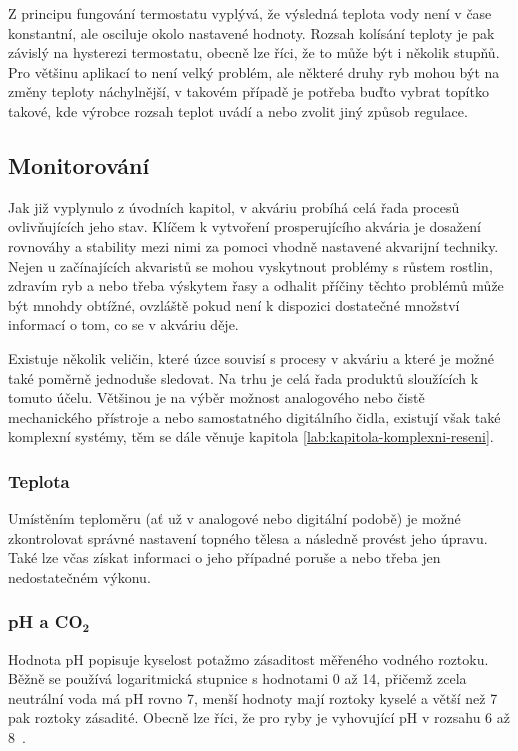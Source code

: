         Z principu fungování termostatu vyplývá, že výsledná teplota vody není v čase konstantní, ale osciluje okolo nastavené hodnoty. Rozsah kolísání teploty je pak závislý na hysterezi termostatu, obecně lze říci, že to může být i několik stupňů. Pro většinu aplikací to není velký problém, ale některé druhy ryb mohou být na změny teploty náchylnější, v takovém případě je potřeba buďto vybrat topítko takové, kde výrobce rozsah teplot uvádí a nebo zvolit jiný způsob regulace. 

    \subsection{Monitorování}
        Jak již vyplynulo z úvodních kapitol, v akváriu probíhá celá řada procesů ovlivňujících jeho stav. Klíčem k vytvoření prosperujícího akvária je dosažení rovnováhy a stability mezi nimi za pomoci vhodně nastavené akvarijní techniky. Nejen u začínajících akvaristů se mohou vyskytnout problémy s růstem rostlin, zdravím ryb a nebo třeba výskytem řasy a odhalit příčiny těchto problémů může být mnohdy obtížné, ovzláště pokud není k dispozici dostatečné množství informací o tom, co se v akváriu děje. 
        
        Existuje několik veličin, které úzce souvisí s procesy v akváriu a které je možné také poměrně jednoduše sledovat. Na trhu je celá řada produktů sloužících k tomuto účelu. Většinou je na výběr možnost analogového nebo čistě mechanického přístroje a nebo samostatného digitálního čidla, existují však také komplexní systémy, těm se dále věnuje kapitola  \ref{lab:kapitola-komplexni-reseni}. 

        \subsubsection{Teplota}
            Umístěním teploměru (ať už v analogové nebo digitální podobě) je možné zkontrolovat správné nastavení topného tělesa a následně provést jeho úpravu. Také lze včas získat informaci o jeho případné poruše a nebo třeba jen nedostatečném výkonu. 
        \subsubsection{pH a CO\(\mathbf{_{2}}\)}
            Hodnota pH popisuje kyselost potažmo zásaditost měřeného vodného roztoku. Běžně se používá logaritmická stupnice s hodnotami 0 až 14, přičemž zcela neutrální voda má pH rovno 7, menší hodnoty mají roztoky kyselé a větší než 7 pak roztoky zásadité.  Obecně lze říci, že pro ryby je vyhovující pH v rozsahu 6 až 8~\cite{slavotinek2014}. 

